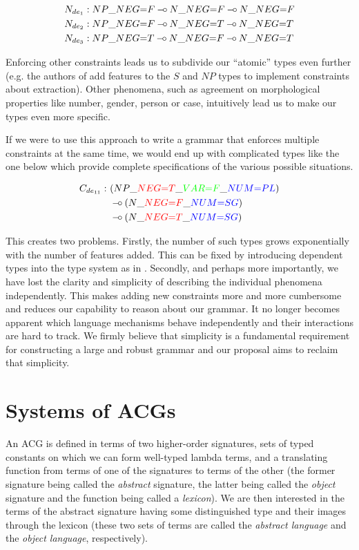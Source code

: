 \documentclass[twocolumn]{article}
\def\limp {\mathbin{{-}\mkern-3.5mu{\circ}}}
\begin{document}
\begin{align*}
N_{de_1} &: NP\_NEG{=}F \limp N\_NEG{=}F \limp N\_NEG{=}F \\
N_{de_2} &: NP\_NEG{=}F \limp N\_NEG{=}T \limp N\_NEG{=}T \\
N_{de_3} &: NP\_NEG{=}T \limp N\_NEG{=}F \limp N\_NEG{=}T
\end{align*}

Enforcing other constraints leads us to subdivide our ``atomic'' types
even further (e.g. the authors of \cite{pogodalla2012controlling} add
features to the $S$ and $NP$ types to implement constraints about
extraction). Other phenomena, such as agreement on morphological
properties like number, gender, person or case, intuitively lead us to
make our types even more specific.

If we were to use this approach to write a grammar that enforces
multiple constraints at the same time, we would end up with complicated
types like the one below which provide complete specifications of the
various possible situations.

\begin{align*}
C_{de_{11}} :\ &(NP\_\textcolor{red}{NEG{=}T}\_\textcolor{green}{VAR{=}F}\_\textcolor{blue}{NUM{=}PL}) \\
&\limp (N\_\textcolor{red}{NEG{=}F}\_\textcolor{blue}{NUM{=}SG}) \\
&\limp (N\_\textcolor{red}{NEG{=}T}\_\textcolor{blue}{NUM{=}SG})
\end{align*}

This creates two problems. Firstly, the number of such types grows
exponentially with the number of features added. This can be fixed by
introducing dependent types into the type system as in
\cite{de2007type}. Secondly, and perhaps more importantly, we have lost
the clarity and simplicity of describing the individual phenomena
independently. This makes adding new constraints more and more
cumbersome and reduces our capability to reason about our grammar. It no
longer becomes apparent which language mechanisms behave independently
and their interactions are hard to track. We firmly believe that
simplicity is a fundamental requirement for constructing a large and
robust grammar and our proposal aims to reclaim that simplicity.

\section{Systems of ACGs}
\label{sec:acg-comp}

An ACG is defined in terms of two higher-order signatures, sets of typed
constants on which we can form well-typed lambda terms, and a
translating function from terms of one of the signatures to terms of the
other (the former signature being called the \emph{abstract} signature,
the latter being called the \emph{object} signature and the function
being called a \emph{lexicon}). We are then interested in the terms of
the abstract signature having some distinguished type and their images
through the lexicon (these two sets of terms are called the
\emph{abstract language} and the \emph{object language}, respectively).
\end{document}
